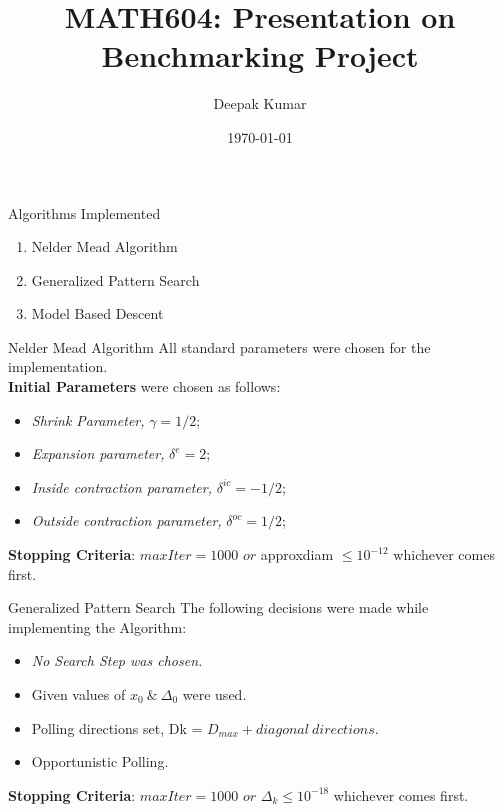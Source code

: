 \documentclass[10pt]{beamer}
\begin{document}
	
	\title{MATH604: Presentation on Benchmarking Project}
	\author{Deepak Kumar}
	\date{\today}
	
	\begin{frame}
		\maketitle
	\end{frame}

	\begin{frame}{Algorithms Implemented}
		\begin{enumerate}
			\item Nelder Mead Algorithm
			\item Generalized Pattern Search
			\item Model Based Descent
		\end{enumerate}
	\end{frame}

	\begin{frame}{Nelder Mead Algorithm}
		All standard parameters were chosen for the implementation. \\
		
		\textbf{Initial Parameters} were chosen as follows: \\
		\begin{itemize}
			\item \textit{Shrink Parameter,} $\gamma = 1/2$; 
			\item \textit{Expansion parameter,} $\delta^e = 2$;
			\item \textit{Inside contraction parameter,} $\delta^{ic}=-1/2$; 
			\item \textit{Outside contraction parameter,} $\delta^{oc}= 1/2$;
		\end{itemize}
		
		\textbf{Stopping Criteria}:
		$maxIter = 1000$ 		$or$	approxdiam $ \leq 10^{-12}$ whichever comes first.
	\end{frame}

	\begin{frame}{Generalized Pattern Search}
		The following decisions were made while implementing the Algorithm: \\
		
		\begin{itemize}
			\item \textit{No Search Step was chosen.}  
			\item Given values of $x_0 \ \& \ \Delta_0$ were used.
			\item Polling directions set, Dk = $D_{max} + diagonal \ directions$.
			\item Opportunistic Polling. 
		\end{itemize}
		
		\textbf{Stopping Criteria}:
		$maxIter = 1000$ 		$or$	 $ \Delta_k \leq 10^{-18}$ whichever comes first.
	\end{frame}
	
\end{document}
